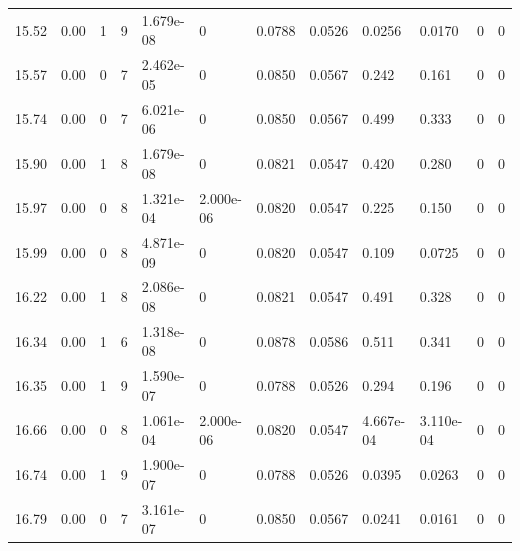 \documentclass[preview]{standalone}
\begin{document}
{{{{\begin{tabular}{L{1.2cm}C{1.2cm} C{0.3cm}C{0.5cm} C{1.4cm}C{1.4cm} C{1.4cm}C{1.4cm} C{1.6cm}C{1.6cm} C{1.6cm}C{1.6cm}}
  15.52  &  0.00  & 1     &  9 &  1.679e-08  & 0  &  0.0788&   0.0526& 0.0256 & 0.0170   &  0 & 0  \\ 
  15.57  &  0.00  & 0     &  7 &  2.462e-05  & 0  &  0.0850&   0.0567& 0.242 & 0.161   &  0 & 0  \\ 
  15.74  &  0.00  & 0     &  7 &  6.021e-06  & 0  &  0.0850&   0.0567& 0.499 & 0.333   &  0 & 0  \\ 
  15.90  &  0.00  & 1     &  8 &  1.679e-08  & 0  &  0.0821&   0.0547& 0.420 & 0.280   &  0 & 0  \\ 
  15.97  &  0.00  & 0     &  8 &  1.321e-04  & 2.000e-06  &  0.0820&   0.0547& 0.225 & 0.150   &  0 & 0  \\ 
  15.99  &  0.00  & 0     &  8 &  4.871e-09  & 0  &  0.0820&   0.0547& 0.109 & 0.0725   &  0 & 0  \\ 
  16.22  &  0.00  & 1     &  8 &  2.086e-08  & 0  &  0.0821&   0.0547& 0.491 & 0.328   &  0 & 0  \\ 
  16.34  &  0.00  & 1     &  6 &  1.318e-08  & 0  &  0.0878&   0.0586& 0.511 & 0.341   &  0 & 0  \\ 
  16.35  &  0.00  & 1     &  9 &  1.590e-07  & 0  &  0.0788&   0.0526& 0.294 & 0.196   &  0 & 0  \\ 
  16.66  &  0.00  & 0     &  8 &  1.061e-04  & 2.000e-06  &  0.0820&   0.0547& 4.667e-04 & 3.110e-04   &  0 & 0  \\ 
  16.74  &  0.00  & 1     &  9 &  1.900e-07  & 0  &  0.0788&   0.0526& 0.0395 & 0.0263   &  0 & 0  \\ 
  16.79  &  0.00  & 0     &  7 &  3.161e-07  & 0  &  0.0850&   0.0567& 0.0241 & 0.0161   &  0 & 0  \\ 
\hline 
\end{tabular} 

}}}}
\end{document}
